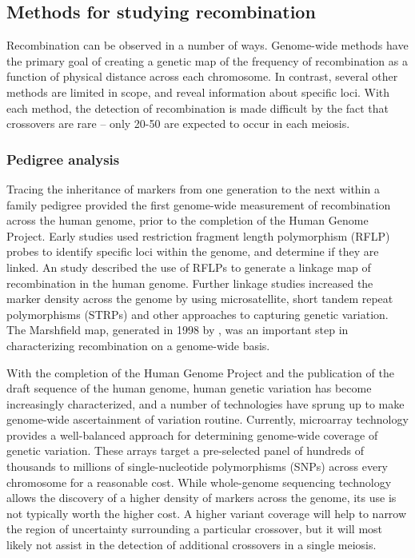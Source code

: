 \subsection{Methods for studying recombination}

Recombination can be observed in a number of ways.
Genome-wide methods have the primary goal of creating a genetic map of the frequency of recombination as a function of physical distance across each chromosome.
In contrast, several other methods are limited in scope, and reveal information about specific loci.
With each method, the detection of recombination is made difficult by the fact that crossovers are rare -- only 20-50 are expected to occur in each meiosis.

\subsubsection{Pedigree analysis}

Tracing the inheritance of markers from one generation to the next within a family pedigree provided the first genome-wide measurement of recombination across the human genome, prior to the completion of the Human Genome Project.
Early studies used restriction fragment length polymorphism (RFLP) probes to identify specific loci within the genome, and determine if they are linked.
An study described the use of RFLPs to generate a linkage map of recombination in the human genome\cite{Botstein1980}.
Further linkage studies increased the marker density across the genome by using microsatellite, short tandem repeat polymorphisms (STRPs) and other approaches to capturing genetic variation\cite{Morton1991,Matise1994,Dib1996}.
The Marshfield map, generated in 1998 by \citet{Broman1998}, was an important step in characterizing recombination on a genome-wide basis.

With the completion of the Human Genome Project and the publication of the draft sequence of the human genome\cite{Venter2001,Lander2001}, human genetic variation has become increasingly characterized, and a number of technologies have sprung up to make genome-wide ascertainment of variation routine.
Currently, microarray technology provides a well-balanced approach for determining genome-wide coverage of genetic variation.
These arrays target a pre-selected panel of hundreds of thousands to millions of single-nucleotide polymorphisms (SNPs) across every chromosome for a reasonable cost.
While whole-genome sequencing technology allows the discovery of a higher density of markers across the genome, its use is not typically worth the higher cost.
A higher variant coverage will help to narrow the region of uncertainty surrounding a particular crossover, but it will most likely not assist in the detection of additional crossovers in a single meiosis.

